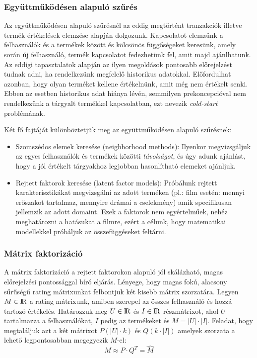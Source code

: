 \documentclass[a4paper,12pt]{article}
\begin{document}
\subsubsection{Együttműködésen alapuló szűrés}

Az együttműködésen alapuló szűrésnél az eddig megtörtént tranzakciók illetve termék értékelések elemzése alapján dolgozunk\cite{korenmf}. Kapcsolatot elemzünk a felhasználók és a termékek között és kölcsönös függőségeket keresünk, amely során új felhasználó, termék kapcsolatot fedezhetünk fel, amit majd ajánlhatunk. Az eddigi tapasztalatok alapján az ilyen megoldások pontosabb előrejelzést tudnak adni, ha rendelkezünk megfelelő historikus adatokkal. Előfordulhat azonban, hogy olyan terméket kellene értékelnünk, amit még nem értékelt senki. Ebben az esetben historikus adat hiánya lévén, semmilyen prekoncepcióval nem rendelkezünk a tárgyalt termékkel kapcsolatban, ezt nevezik \textsl{cold-start} problémának.\newline

Két fő fajtáját különböztetjük meg az együttműködésen alapuló szűrésnek:
\begin{itemize}
\item Szomszédos elemek keresése (neighborhood methods): Ilyenkor megvizsgáljuk az egyes felhasználók és termékek közötti \textsl{távolságot}, és úgy adunk ajánlást, hogy a jól értékelt tárgyakhoz legjobban hasonlítható elemeket ajánljuk.
\item Rejtett faktorok keresése (latent factor models): Próbálunk rejtett karakterisztikákat megvizsgálni az adott terméken (pl.: film esetén: mennyi erőszakot tartalmaz, mennyire drámai a cselekmény) amik specifikusan jellemzik az adott domaint. Ezek a faktorok nem egyértelműek, nehéz meghatározni a hatásukat a filmre, ezért a célunk, hogy matematikai modellekkel próbáljuk az összefüggéseket feltárni. 
\end{itemize}

\subsubsection{Mátrix faktorizáció}
A mátrix faktorizáció a rejtett faktorokon alapuló jól skálázható, magas előrejelzési pontossággal bíró eljárás. Lényege, hogy magas fokú, alacsony sűrűségű rating mátrixunkat felbontjuk két kisebb mátrix szorzatára. Legyen $M \in \rm I\!R$ a rating mátrixunk, amiben szerepel az összes felhasználó és hozzá tartozó értékelés. Határozzuk meg $U\in\rm I\!R$ és $I\in\rm I\!R$ részmátrixot, ahol $U$ tartalmazza a felhasználókat, $I$ pedig az termékeket és $M=|U| \cdot |I|$. Feladat, hogy megtaláljuk azt a két mátrixot $P(|U| \cdot k)$ és $Q(k \cdot |I|)$ amelyek szorzata a lehető legpontosabban megegyezik $M$-el:
\[M \approx P \cdot Q^T = \hat{M}\]
\end{document}
